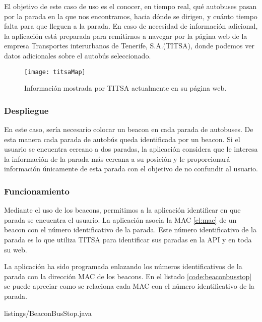El objetivo de este caso de uso es el conocer, en tiempo real, qué autobuses pasan por la parada en la que nos encontramos, hacia dónde se dirigen, y cuánto tiempo falta para que lleguen a la parada. En caso de necesidad de información adicional, la aplicación está preparada para remitirnos a navegar por la página web \cite{URL::titsa} de la empresa Transportes interurbanos de Tenerife, S.A.(TITSA), donde podemos ver datos adicionales sobre el autobús seleccionado.

\begin{figure}[H]
	\centering
	\texttt{[image: titsaMap]}
	\caption{Información mostrada por TITSA actualmente en su página web.}
	\label{fig:MapaTitsa}
\end{figure}

\subsubsection{Despliegue}

En este caso, sería necesario colocar un beacon en cada parada de autobuses. De esta manera cada parada de autobús queda identificada por un beacon. Si el usuario se encuentra cercano a dos paradas, la aplicación considera que le interesa la información de la parada más cercana a su posición y le proporcionará información únicamente de esta parada con el objetivo de no confundir al usuario.

\subsubsection{Funcionamiento}


Mediante el uso de los beacons, permitimos a la aplicación identificar en que parada se encuentra el usuario. La aplicación asocia la MAC \ref{el:mac} de un beacon con el número identificativo de la parada. Este número identificativo de la parada es lo que utiliza TITSA para identificar sus paradas en la API y en toda su web. 


La aplicación ha sido programada enlazando los números identificativos de la parada con la dirección MAC de los beacons. En el listado \ref{code:beaconbusstop} se puede apreciar como se relaciona cada MAC con el número identificativo de la parada.



{listings/BeaconBusStop.java} %


